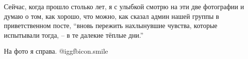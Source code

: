 Сейчас, когда прошло столько лет, я с улыбкой смотрю на эти две фотографии и
думаю о том, как хорошо, что можно, как сказал админ нашей группы в
приветственном посте, \enquote{вновь пережить нахлынувшие чувства, которые испытывали
тогда, – в те далекие тёплые дни.}

На фото я справа. @igg{fbicon.smile} 

